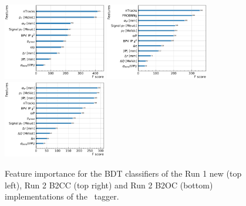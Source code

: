 \begin{figure}[t]
        \begin{center}
        \includegraphics[width=0.4\textwidth]{04Flavourtagging/figs/OSelectronOpt/2017-12-12-vibattis-OSElectron-bdt-calibration-sWeights_Run1/Importance_RunIcuts.pdf}
        \includegraphics[width=0.4\textwidth]{04Flavourtagging/figs/OSelectronOpt/2017-12-12-vibattis-OSElectron-bdt-calibration-sWeights_Run2/Importance_RunIIcuts.pdf} \\
        \includegraphics[width=0.4\textwidth]{04Flavourtagging/figs/OSelectronOpt/2018-04-07-vibattis-OSElectron-bdt-calibration-sWeights_Run2_Bu2D0pi/Importance_RunIIcuts.pdf}
        \end{center}
        \vspace{-2mm}
        \caption{Feature importance for the BDT classifiers of the Run 1 new (top left), Run 2 B2CC (top right) and Run 2 B2OC (bottom) implementations of the \OSe~tagger.}
         \label{fig:OSeimportance}
\end{figure}


